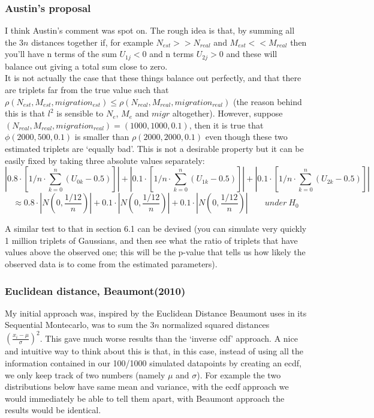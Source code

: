 \documentclass[a4paper,12pt]{article}
\begin{document}
{\subsubsection {Austin's proposal}
I think Austin's comment was spot on. The rough idea is that, by summing all the $3n$ distances together if, for example $N_{est} >> N_{real}$ and $M_{est} << M_{real}$ then you'll have n terms of the sum $U_{1j} < 0$ and n terms $U_{2j} > 0$ and these will balance out giving a total sum close to zero.\\
\noindent It is not actually the case that these things balance out perfectly, and that there are triplets far from the true value such that 
 $\rho(N_{est}, M_{est}, migration_{est}) \le \rho (N_{real}, M_{real}, migration_{real})$ (the reason behind this is that $l^2$ is sensible to $N_e$, $M_e$ and $migr$ altogether). However, suppose $(N_{real}, M_{real}, migration_{real}) = (1000,1000,0.1)$, then it is true that $\phi(2000, 500, 0.1)$ is smaller than $\rho(2000,2000,0.1)$ even though these two estimated triplets are `equally bad'. This is not a desirable property but it can be easily fixed by taking three absolute values separately:
$$ |0.8\cdot [1/n \cdot \sum_{k= 0}^{n} (U_{0k} - 0.5)]|
+ |0.1 \cdot [1/n \cdot\sum_{k= 0}^{n} (U_{1k} - 0.5)]| + |0.1 \cdot [1/n \cdot\sum_{k= 0}^{n} (U_{2k} - 0.5)]|$$ 
$$ \approx 0.8\cdot |N(0, \frac{1/12}{n})| + 0.1 \cdot |N(0, \frac{1/12}{n})|+ 0.1 \cdot |N(0, \frac{1/12}{n})| \qquad under \: H_0$$

A similar test to that in section 6.1 can be devised (you can simulate very quickly 1 million triplets of Gaussians, and then see what the ratio of triplets that have values above the observed one; this will be the p-value that tells us how likely the observed data is to come from the estimated parameters).

\subsubsection {Euclidean distance, Beaumont(2010)}
My initial approach was, inspired by the Euclidean Distance Beaumont uses in its Sequential Montecarlo, was to sum the $3n$ normalized squared distances $(\frac{x_i - \mu}{\sigma})^2$. This gave much worse results than the `inverse cdf' approach. A nice and intuitive way to think about this is that, in this case, instead of using all the information contained in our 100/1000 simulated datapoints by creating an ecdf, we only keep track of two numbers (namely $\mu$ and $\sigma$). For example the two distributions below have same mean and variance, with the ecdf approach we would immediately be able to tell them apart, with Beaumont approach the results would be identical.

}
\end{document}
